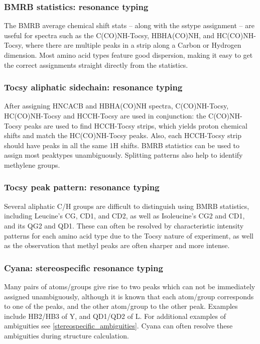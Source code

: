 \subsubsection{BMRB statistics: resonance typing}
The BMRB average chemical shift stats -- along with the sstype assignment -- 
are useful for spectra such as the C(CO)NH-Tocsy, HBHA(CO)NH, and 
HC(CO)NH-Tocsy, where there are multiple peaks in a strip along a Carbon or
Hydrogen dimension. Most amino acid types feature good dispersion, making it 
easy to get the correct assignments straight directly from the statistics.

\subsubsection{Tocsy aliphatic sidechain: resonance typing}
After assigning HNCACB and HBHA(CO)NH spectra, C(CO)NH-Tocsy, HC(CO)NH-Tocsy 
and HCCH-Tocsy are used in conjunction:
the C(CO)NH-Tocsy peaks are used to find HCCH-Tocsy strips, which yields proton 
chemical shifts and match the HC(CO)NH-Tocsy peaks.  Also, each HCCH-Tocsy 
strip should have peaks in all the same 1H shifts.
BMRB statistics can be used to assign most peaktypes unambiguously.  
Splitting patterns also help to identify methylene groups.

\subsubsection{Tocsy peak pattern: resonance typing}
Several aliphatic C/H groups are difficult to distinguish using BMRB statistics,
including Leucine's CG, CD1, and CD2, as well as Isoleucine's CG2 and CD1, and
its QG2 and QD1. These can often be resolved by characteristic intensity 
patterns for each amino acid type due to the Tocsy nature of experiment,
as well as the observation that methyl peaks are often sharper and more intense.

\subsubsection{Cyana: stereospecific resonance typing}
Many pairs of atoms/groups give rise to two peaks which can not be immediately
assigned unambiguously, although it is known that each atom/group corresponds 
to one of the peaks, and the other atom/group to the other peak.
Examples include HB2/HB3 of Y, and QD1/QD2 of L.
For additional examples of ambiguities see \ref{stereospecific_ambiguities}.
Cyana can often resolve these ambiguities during structure calculation.


